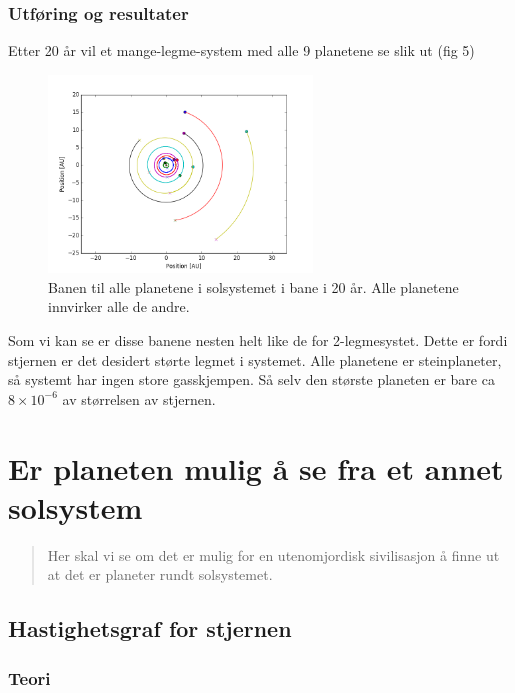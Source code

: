 \documentclass[a4paper,norsk,11pt,twoside]{article}
\begin{document}
\subsubsection{Utføring og resultater}

Etter 20 år vil et mange-legme-system med alle 9 planetene se slik ut (fig 5)

\begin{figure}[hbt]
\begin{center}
\includegraphics[width=70mm]{full_system_n_body.png}
\caption{Banen til alle planetene i solsystemet i bane i 20 år. Alle planetene innvirker alle de andre.}\label{fig:finfigur}
\end{center}
\end{figure}

Som vi kan se er disse banene nesten helt like de for 2-legmesystet. Dette er fordi stjernen er det desidert størte legmet i systemet. Alle planetene er steinplaneter, så systemt har ingen store gasskjempen. Så selv den største planeten er bare ca $8 \times 10^{-6}$ av størrelsen av stjernen.

\section{Er planeten mulig å se fra et annet solsystem}
\begin{abstract}
Her skal vi se om det er mulig for en utenomjordisk sivilisasjon å finne ut at det er planeter rundt solsystemet.
\end{abstract}

\subsection{Hastighetsgraf for stjernen}

\subsubsection{Teori}
\end{document}
